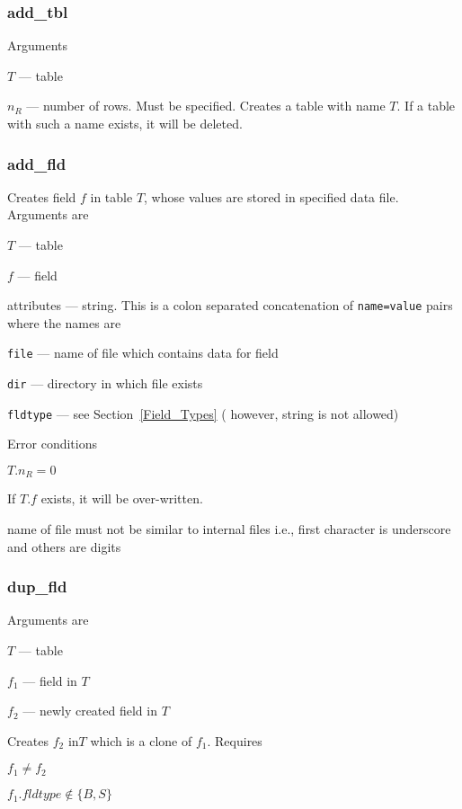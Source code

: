 \subsubsection{add\_tbl}
\label{add_tbl}
Arguments 
\be
\item \(T\) --- table
\item \(n_R\) --- number of rows. Must be specified.
\ee
Creates a table with name \(T\). If a table with such a name exists, it
will be deleted.


\subsubsection{add\_fld}
\label{add_fld}

Creates field \(f\) in table \(T\), whose values are stored in specified
data file.  Arguments are 
\be
\item \(T\) --- table
\item \(f\) --- field
\item attributes --- string. This is a colon separated concatenation of
\verb+name=value+ pairs where the names are
\be
\item \verb+file+ --- name of file which contains data for field 
\item \verb+dir+ --- directory in which file exists
\item \verb+fldtype+ --- see Section~\ref{Field_Types} ( however, string
    is not allowed)
\ee
\ee

Error conditions
\be
\item \(T.n_R = 0 \)
\item If \(T.f\) exists, it will be over-written.
\item name of file must not be similar to internal files i.e., first
character is underscore and others are digits
\ee


\subsubsection{dup\_fld}
\label{dup_fld}
Arguments are 
\be
\item \(T\) --- table
\item \(f_1\) --- field in \(T\)
\item \(f_2\) --- newly created field in \(T\)
\ee

Creates \(f_2\) in\(T\) which is a clone of \(f_1\). Requires
\be
\item \(f_1 \neq f_2\)
\item \(f_1.fldtype \not \in \{B, S\}\)
\ee

